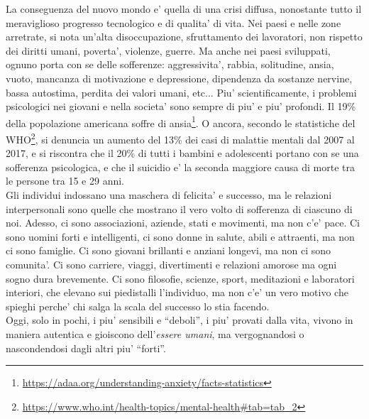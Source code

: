 La conseguenza del nuovo mondo e' quella di una crisi diffusa, nonostante tutto il meraviglioso progresso tecnologico e di qualita' di vita. Nei paesi e nelle zone arretrate, si nota un'alta disoccupazione, sfruttamento dei lavoratori, non rispetto dei diritti umani, poverta', violenze, guerre. Ma anche nei paesi sviluppati, ognuno porta con se delle sofferenze:
  aggressivita', rabbia, solitudine, ansia, vuoto, mancanza di motivazione e depressione, dipendenza da sostanze nervine, bassa autostima, perdita dei valori umani, etc... Piu' scientificamente, i problemi psicologici nei giovani e nella societa' sono sempre di piu' e piu' profondi. Il 19\% della popolazione americana soffre di ansia\footnote{\url{https://adaa.org/understanding-anxiety/facts-statistics}}. O ancora,
secondo le statistiche del WHO\footnote{\url{https://www.who.int/health-topics/mental-health\#tab=tab\_2}}, si denuncia un aumento del 13\% dei casi di malattie mentali dal 2007 al 2017, e si riscontra che il 20\% di tutti i bambini e adolescenti portano con se una sofferenza psicologica, e che il suicidio e' la seconda maggiore causa di morte tra le persone tra 15 e 29 anni.\\
 Gli individui indossano una maschera di felicita' e successo, ma le relazioni interpersonali sono quelle che mostrano il vero volto di sofferenza di ciascuno di noi. Adesso, ci sono associazioni, aziende, stati e movimenti, ma non c'e' pace. Ci sono uomini forti e intelligenti, ci sono donne in salute, abili e attraenti, ma non ci sono famiglie. Ci sono giovani brillanti e anziani longevi, ma non ci sono comunita'. Ci sono carriere, viaggi, divertimenti e relazioni amorose ma ogni sogno dura brevemente. Ci sono filosofie, scienze, sport, meditazioni e laboratori interiori, che elevano sui piedistalli l'individuo, ma non c'e' un vero motivo che spieghi perche' chi salga la scala del successo lo stia facendo.\\
Oggi, solo in pochi, i piu' sensibili e ``deboli'', i piu' provati dalla vita, vivono in maniera autentica e gioiscono dell'\emph{essere umani}, ma vergognandosi o nascondendosi dagli altri piu' ``forti''.

